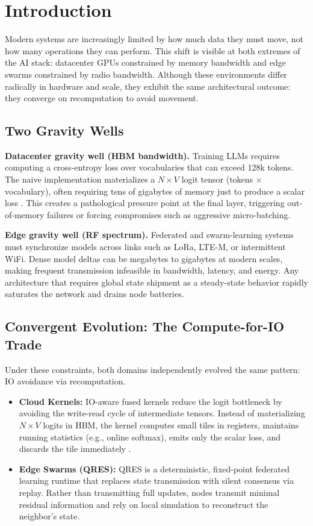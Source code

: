 \documentclass[conference]{IEEEtran}
\begin{document}
\section{Introduction}
Modern systems are increasingly limited by how much data they must move, not how many operations they can perform. This shift is visible at both extremes of the AI stack: datacenter GPUs constrained by memory bandwidth and edge swarms constrained by radio bandwidth. Although these environments differ radically in hardware and scale, they exhibit the same architectural outcome: they converge on recomputation to avoid movement.

\subsection{Two Gravity Wells}
\textbf{Datacenter gravity well (HBM bandwidth).} Training LLMs requires computing a cross-entropy loss over vocabularies that can exceed 128k tokens. The naive implementation materializes a $N \times V$ logit tensor (tokens $\times$ vocabulary), often requiring tens of gigabytes of memory just to produce a scalar loss \cite{narang2021efficient}. This creates a pathological pressure point at the final layer, triggering out-of-memory failures or forcing compromises such as aggressive micro-batching.

\textbf{Edge gravity well (RF spectrum).} Federated and swarm-learning systems must synchronize models across links such as LoRa, LTE-M, or intermittent WiFi. Dense model deltas can be megabytes to gigabytes at modern scales, making frequent transmission infeasible in bandwidth, latency, and energy. Any architecture that requires global state shipment as a steady-state behavior rapidly saturates the network and drains node batteries.

\subsection{Convergent Evolution: The Compute-for-IO Trade}
Under these constraints, both domains independently evolved the same pattern: IO avoidance via recomputation.

\begin{itemize}
    \item \textbf{Cloud Kernels:} IO-aware fused kernels reduce the logit bottleneck by avoiding the write-read cycle of intermediate tensors. Instead of materializing $N \times V$ logits in HBM, the kernel computes small tiles in registers, maintains running statistics (e.g., online softmax), emits only the scalar loss, and discards the tile immediately \cite{dao2022flashattention}.
    \item \textbf{Edge Swarms (QRES):} QRES is a deterministic, fixed-point federated learning runtime that replaces state transmission with silent consensus via replay. Rather than transmitting full updates, nodes transmit minimal residual information and rely on local simulation to reconstruct the neighbor's state.
\end{itemize}
\end{document}
